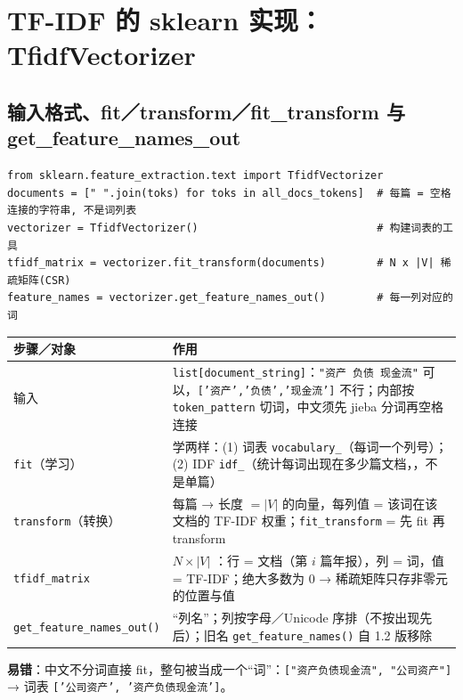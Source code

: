 \section{TF-IDF 的 sklearn 实现：TfidfVectorizer}

\subsection{输入格式、fit／transform／fit\_transform 与 get\_feature\_names\_out}
\begin{lstlisting}[style=pyD08a]
from sklearn.feature_extraction.text import TfidfVectorizer
documents = [" ".join(toks) for toks in all_docs_tokens]  # 每篇 = 空格连接的字符串, 不是词列表
vectorizer = TfidfVectorizer()                            # 构建词表的工具
tfidf_matrix = vectorizer.fit_transform(documents)        # N x |V| 稀疏矩阵(CSR)
feature_names = vectorizer.get_feature_names_out()        # 每一列对应的词
\end{lstlisting}
\vspace{-4pt}
\begin{tabD08a}
\begin{tabularx}{\linewidth}{@{}p{3.2cm}L@{}}
\toprule
步骤／对象 & 作用 \\
\midrule
输入 & \texttt{list[document\_string]}：\texttt{"资产 负债 现金流"} 可以，\texttt{['资产','负债','现金流']} 不行；内部按 \texttt{token\_pattern} 切词，中文须先 jieba 分词再空格连接 \\
\texttt{fit}（学习）& 学两样：(1) 词表 \texttt{vocabulary\_}（每词一个列号）；(2) IDF \texttt{idf\_}（统计每词出现在多少篇文档，，不是单篇）\\
\texttt{transform}（转换）& 每篇 → 长度 $=|V|$ 的向量，每列值 = 该词在该文档的 TF-IDF 权重；\texttt{fit\_transform} = 先 fit 再 transform \\
\texttt{tfidf\_matrix} & $N\times|V|$ ：行 = 文档（第 $i$ 篇年报），列 = 词，值 = TF-IDF；绝大多数为 0 → 稀疏矩阵只存非零元的位置与值 \\
\texttt{get\_feature\_names\_out()} & “列名”；列按字母／Unicode 序排（不按出现先后）；旧名 \texttt{get\_feature\_names()} 自 1.2 版移除 \\
\bottomrule
\end{tabularx}
\end{tabD08a}
\textbf{易错}：中文不分词直接 fit，整句被当成一个“词”：\texttt{["资产负债现金流", "公司资产"]} → 词表 \texttt{['公司资产', '资产负债现金流']}。

